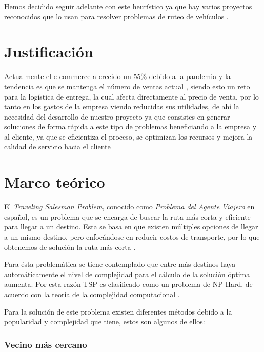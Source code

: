 \documentclass[journal]{IEEEtran}
\begin{document}
        Hemos decidido seguir adelante con este heurístico ya que hay varios proyectos reconocidos que lo usan para resolver problemas de ruteo de vehículos \cite{ERDOGAN201762}.

    \section{Justificación} \label{sec:justification}

        Actualmente el e-commerce a crecido un 55\% debido a la pandemia y la tendencia es que se mantenga el número de ventas actual \cite{koetsier-2022}, siendo esto un reto para la logística de entrega, la cual afecta directamente al precio de venta, por lo tanto en los gastos de la empresa viendo reducidas sus utilidades, de ahí la necesidad del desarrollo de nuestro proyecto ya que consistes en generar soluciones de forma rápida a este tipo de problemas beneficiando a la empresa y al cliente, ya que se eficientiza el proceso, se optimizan los recursos y mejora la calidad de servicio hacia el cliente

    \section{Marco teórico} \label{sec:theoretical}
    
        El \emph{Traveling Salesman Problem}, conocido como \emph{Problema del Agente Viajero} en español, es un problema que se encarga de buscar la ruta más corta y eficiente para llegar a un destino. Esta se basa en que existen múltiples opciones de llegar a un mismo destino, pero enfocándose en reducir costos de transporte, por lo que obtenemos de solución la ruta más corta \cite{trevelingProb}.

        Para ésta problemática se tiene contemplado que entre más destinos haya automáticamente el nivel de complejidad para el cálculo de la solución óptima aumenta. Por esta razón TSP es clasificado como un problema de NP-Hard, de acuerdo con la teoría de la complejidad computacional \cite{trevelingProb}.

        Para la solución de este problema existen diferentes métodos debido a la popularidad y complejidad que tiene, estos son algunos de ellos:
        
        \subsubsection{Vecino más cercano}
        
\end{document}
